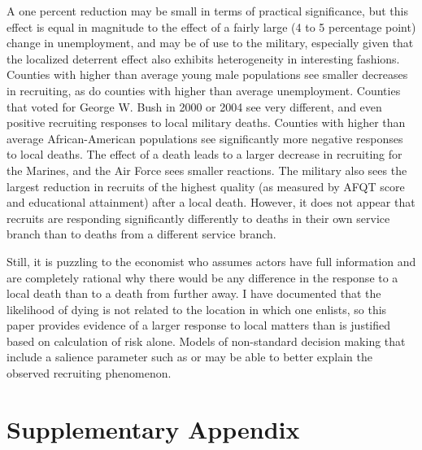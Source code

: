 \documentclass[12pt] {article}
\begin{document}
A one percent reduction may be small in terms of practical significance, but this effect is equal in magnitude to the effect of a fairly large (4 to 5 percentage point) change in unemployment, and may be of use to the military, especially given that the localized deterrent effect also exhibits heterogeneity in interesting fashions. Counties with higher than average young male populations
see smaller decreases in recruiting, as do counties with higher than
average unemployment. Counties that voted for George W. Bush in 2000
or 2004 see very different, and even positive recruiting responses
to local military deaths. Counties with higher than average African-American
populations see significantly more negative responses to local deaths.
The effect of a death leads to a larger decrease in recruiting for
the Marines, and the Air Force sees smaller reactions. The military
also sees the largest reduction in recruits of the highest quality
(as measured by AFQT score and educational attainment) after a local
death. However, it does not appear that recruits are responding significantly
differently to deaths in their own service branch than to deaths from
a different service branch. 

Still, it is puzzling to the economist who assumes actors have full
information and are completely rational why there would be any difference
in the response to a local death than to a death from further away.
I have documented that the likelihood of dying is not related to the
location in which one enlists, so this paper provides evidence of
a larger response to local matters than is justified based on calculation
of risk alone. Models of non-standard decision making that include
a salience parameter such as \cite{ChettySalience} or \cite{eBayEarly}
may be able to better explain the observed recruiting phenomenon. 







\newpage
\appendix

\section{Supplementary Appendix}
\setcounter{table}{0}
\renewcommand{\thetable}{A\arabic{table}}
\end{document}
